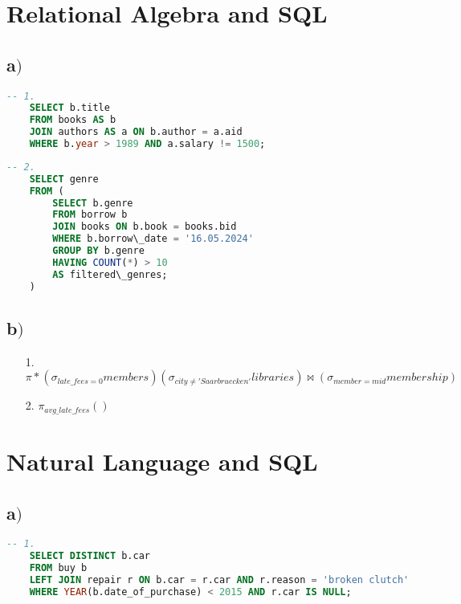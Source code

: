 



\section{ Relational Algebra and SQL}	

\subsection{a$)$}

\begin{lstlisting}[language=SQL]
	-- 1.
	SELECT b.title
	FROM books AS b
	JOIN authors AS a ON b.author = a.aid
	WHERE b.year > 1989 AND a.salary != 1500;
\end{lstlisting}

\begin{lstlisting}[language=SQL]
	-- 2.
	SELECT genre
	FROM (
		SELECT b.genre
		FROM borrow b
		JOIN books ON b.book = books.bid
		WHERE b.borrow\_date = '16.05.2024'
		GROUP BY b.genre
		HAVING COUNT(*) > 10
		AS filtered\_genres;
	)
\end{lstlisting}

\subsection{b$)$}

\begin{itemize}
	\item[1.] $\pi * ({\sigma}_{late\_fees = 0} members) ({\sigma}_{city \neq 'Saarbruecken'} libraries) \Join ({\sigma}_{member = mid} membership)$
	\item[2.] ${\pi}_{avg\_late\_fees} ()$
\end{itemize}
	
\section{Natural Language and SQL}	

\subsection{a$)$}

\begin{lstlisting}[language=SQL]
	-- 1.
	SELECT DISTINCT b.car
	FROM buy b
	LEFT JOIN repair r ON b.car = r.car AND r.reason = 'broken clutch'
	WHERE YEAR(b.date_of_purchase) < 2015 AND r.car IS NULL;
\end{lstlisting}


